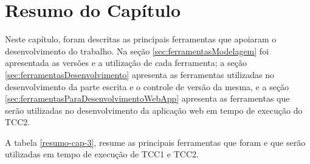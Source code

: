 \section{Resumo do Capítulo}

Neste capítulo, foram descritas as principais ferramentas que apoiaram o desenvolvimento do trabalho. Na seção \ref{sec:ferramentasModelagem} foi apresentada as versões e a utilização de cada ferramenta; a seção \ref{sec:ferramentasDesenvolvimento} apresenta as ferramentas utilizadas no desenvolvimento da parte escrita e o controle de versão da mesma, e a seção \ref{sec:ferramentasParaDesenvolvimentoWebApp} apresenta as ferramentas que serão utilizadas no desenvolvimento da aplicação web em tempo de execução do TCC2. 

A tabela \ref{resumo-cap-3}, resume as principais ferramentas que foram e que serão utilizadas em tempo de execução de TCC1 e TCC2. 

